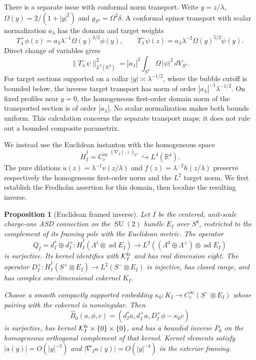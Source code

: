 \documentclass[11pt]{amsart}
\newtheorem{proposition}[theorem]{Proposition}
\theoremstyle{definition}
\theoremstyle{remark}
\theoremstyle{plain}
\newcommand{\RR}{\mathbb{R}}
\newcommand{\cK}{\mathcal{K}}
\newcommand{\ad}{\operatorname{ad}}
\newcommand{\SU}{\operatorname{SU}}
\begin{document}
There is a separate issue with conformal norm transport.  Write
$y=z/\lambda$, $\Omega(y)=2/(1+|y|^2)$ and
$g_{S^4}=\Omega^2\delta$.  A conformal spinor transport with scalar
normalization $a_\lambda$ has the domain and target weights
\begin{equation}\label{eq:conformal-transport-weights}
 T^+_\lambda\phi(z)=a_\lambda\lambda^{-1}\Omega(y)^{3/2}\phi(y),
 \qquad
 T^-_\lambda\psi(z)=a_\lambda\lambda^{-2}\Omega(y)^{5/2}\psi(y).
\end{equation}
Direct change of variables gives
\begin{equation}\label{eq:transport-norm-identity}
 \|T^-_\lambda\psi\|_{L^2(\RR^4)}^2
 =|a_\lambda|^2\int_{S^4}\Omega\,|\psi|^2\,dV_{S^4}.
\end{equation}
For target sections supported on a collar $|y|\asymp\lambda^{-1/2}$,
where the bubble cutoff is bounded below, the inverse target transport has
norm of order $|a_\lambda|^{-1}\lambda^{-1/2}$.  On fixed profiles near
$y=0$, the homogeneous first-order domain norm of the transported section
is of order $|a_\lambda|$.  No scalar normalization makes both bounds
uniform.  This calculation concerns the separate transport maps; it does
not rule out a bounded composite parametrix.

We instead use the Euclidean instanton with the homogeneous space
\begin{equation}\label{eq:euclidean-bubble-domain}
 \dot H_I^1=\overline{C_c^\infty}^{\,\|\nabla_I(\cdot)\|_{L^2}}
 \hookrightarrow L^4(\RR^4).
\end{equation}
The pure dilations $u(z)=\lambda^{-1}v(z/\lambda)$ and
$f(z)=\lambda^{-2}h(z/\lambda)$ preserve respectively the homogeneous
first-order norm and the $L^2$ target norm.  We first establish the
Fredholm assertion for this domain, then localize the resulting inverse.

\begin{proposition}[Euclidean framed inverse]\label{prop:euclidean-fredholm}
Let $I$ be the centered, unit-scale charge-one ASD connection on the
$\SU(2)$ bundle $E_I$ over $S^4$, restricted to the complement of its
framing pole with the Euclidean metric.  The operator
\[
 Q_I=d_I^*\oplus d_I^+:
 \dot H_I^1(\Lambda^1\otimes\ad E_I)
 \longrightarrow L^2((\Lambda^0\oplus\Lambda^+)\otimes\ad E_I)
\]
is surjective.  Its kernel identifies with $\cK_I^{\rm fr}$ and has
real dimension eight.  The operator
$D_I^+:\dot H_I^1(S^+\otimes E_I)\to L^2(S^-\otimes E_I)$
is injective, has closed range, and has complex one-dimensional
cokernel $K_I$.

Choose a smooth compactly supported embedding
$\kappa_0:K_I\to C_c^\infty(S^-\otimes E_I)$ whose pairing with
the cokernel is nonsingular.  Then
\begin{equation}\label{eq:euclidean-augmented}
 \widehat B_0(a,\phi,c)
 =(d_I^*a,d_I^+a,D_I^+\phi-\kappa_0c)
\end{equation}
is surjective, has kernel $\cK_I^{\rm fr}\times\{0\}\times\{0\}$,
and has a bounded inverse $P_0$ on the homogeneous orthogonal
complement of that kernel.  Kernel elements satisfy
$|a(y)|=O(|y|^{-3})$ and $|\nabla_Ia(y)|=O(|y|^{-4})$
in the exterior framing.
\end{proposition}
\end{document}
